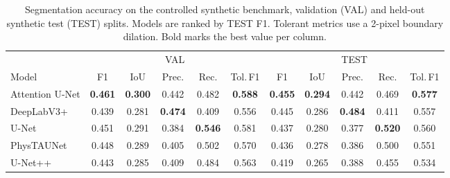 \begin{table}[t]
\centering
\caption{Segmentation accuracy on the controlled synthetic benchmark, validation (VAL) and held-out synthetic test (TEST) splits. Models are ranked by TEST F1. Tolerant metrics use a 2-pixel boundary dilation. Bold marks the best value per column.}
\label{tab:main_results}
\small
\begin{tabular}{l ccccc ccccc}
\toprule
 & \multicolumn{5}{c}{VAL} & \multicolumn{5}{c}{TEST} \\
\cmidrule(lr){2-6} \cmidrule(lr){7-11}
Model & F1 & IoU & Prec. & Rec. & Tol.\,F1 & F1 & IoU & Prec. & Rec. & Tol.\,F1 \\
\midrule
Attention U-Net & \textbf{0.461} & \textbf{0.300} & 0.442 & 0.482 & \textbf{0.588} & \textbf{0.455} & \textbf{0.294} & 0.442 & 0.469 & \textbf{0.577} \\
DeepLabV3+ & 0.439 & 0.281 & \textbf{0.474} & 0.409 & 0.556 & 0.445 & 0.286 & \textbf{0.484} & 0.411 & 0.557 \\
U-Net & 0.451 & 0.291 & 0.384 & \textbf{0.546} & 0.581 & 0.437 & 0.280 & 0.377 & \textbf{0.520} & 0.560 \\
PhysTAUNet & 0.448 & 0.289 & 0.405 & 0.502 & 0.570 & 0.436 & 0.278 & 0.386 & 0.500 & 0.551 \\
U-Net++ & 0.443 & 0.285 & 0.409 & 0.484 & 0.563 & 0.419 & 0.265 & 0.388 & 0.455 & 0.534 \\
\bottomrule
\end{tabular}
\end{table}
